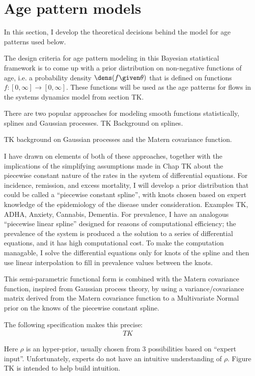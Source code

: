 \section{Age pattern models}

In this section, I develop the theoretical decisions behind the model for age patterns used below.

The design criteria for age pattern modeling in this Bayesian
statistical framework is to come up with a prior distribution on
non-negative functions of age, i.e. a probability density
$\dens(f\given\theta)$ that is defined on functions
$f:[0,\infty]\rightarrow[0,\infty]$.  These functions will be used as
the age patterns for flows in the systems dynamics model from section
TK.

There are two popular approaches for modeling smooth functions
statistically, splines and Gaussian processes. TK Background on
splines.

TK background on Gaussian processes and the Matern covariance
function.

I have drawn on elements of both of these approaches, together with
the implications of the simplifying assumptions made in Chap TK about
the piecewise constant nature of the rates in the system of
differential equations.  For incidence, remission, and excess
mortality, I will develop a prior distribution that could be called a
``piecewise constant spline'', with knots chosen based on expert
knowledge of the epidemiology of the disease under consideration.
Examples TK, ADHA, Anxiety, Cannabis, Dementia.  For prevalence, I
have an analogous ``piecewise linear spline'' designed for reasons of
computational efficiency; the prevalence of the system is produced a
the solution to a series of differential equations, and it has high
computational cost.  To make the computation managable, I solve the
differential equations only for knots of the spline and then use
linear interpolation to fill in prevalence values between the knots.

This semi-parametric functional form is combined with the Matern
covariance function, inspired from Gaussian process theory, by using a
variance/covariance matrix derived from the Matern covariance function
to a Multivariate Normal prior on the knows of the piecewise constant
spline.

The following specification makes this precise:
\begin{align*}
TK
\end{align*}

Here $\rho$ is an hyper-prior, usually chosen from $3$
possibilities based on ``expert input''.  Unfortunately, experts do
not have an intuitive understanding of $\rho$.  Figure TK is intended
to help build intuition.

